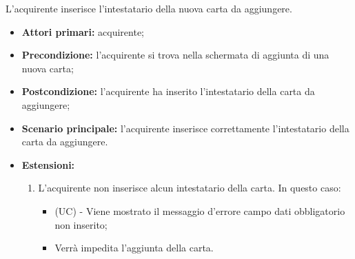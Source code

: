 \resetSubSubUC

L'acquirente inserisce l'intestatario della nuova carta da aggiungere.
\begin{itemize}
    \item \textbf{Attori primari:} acquirente;
    \item \textbf{Precondizione:} l'acquirente si trova nella schermata di aggiunta di una nuova carta;
    \item \textbf{Postcondizione:} l'acquirente ha inserito l'intestatario della carta da aggiungere;
    \item \textbf{Scenario principale:} l'acquirente inserisce correttamente l'intestatario della carta da aggiungere.
    \item \textbf{Estensioni:}
    \begin{enumerate}[label=\lett]
        \item L'acquirente non inserisce alcun intestatario della carta. In questo caso:
        \begin{itemize}
            \item (UC) - Viene mostrato il messaggio d'errore campo dati obbligatorio non inserito;
            \item Verrà impedita l'aggiunta della carta.
        \end{itemize}
    \end{enumerate}
\end{itemize}


